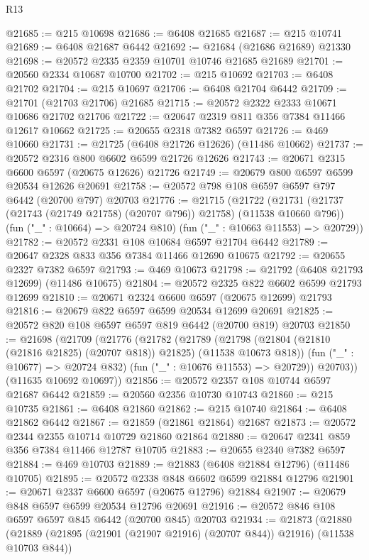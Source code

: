 \begin{lexlean}{R13}
\begin{coremodule}
@21685 := @215 @10698
@21686 := @6408 @21685
@21687 := @215 @10741
@21689 := @6408 @21687 @6442
@21692 := @21684 (@21686 @21689) @21330
@21698 := @20572 @2335 @2359 @10701 @10746 @21685 @21689
@21701 := @20560 @2334 @10687 @10700
@21702 := @215 @10692
@21703 := @6408 @21702
@21704 := @215 @10697
@21706 := @6408 @21704 @6442
@21709 := @21701 (@21703 @21706) @21685
@21715 := @20572 @2322 @2333 @10671 @10686 @21702 @21706
@21722 := @20647 @2319 @811 @356 @7384 @11466 @12617 @10662
@21725 := @20655 @2318 @7382 @6597
@21726 := @469 @10660
@21731 := @21725 (@6408 @21726 @12626) (@11486 @10662)
@21737 := @20572 @2316 @800 @6602 @6599 @21726 @12626
@21743 := @20671 @2315 @6600 @6597 (@20675 @12626) @21726
@21749 := @20679 @800 @6597 @6599 @20534 @12626 @20691
@21758 := @20572 @798 @108 @6597 @6597 @797 @6442 (@20700 @797) @20703
@21776 := @21715
    (@21722
      (@21731 (@21737 (@21743 (@21749 @21758) (@20707 @796)) @21758) (@11538 @10660 @796))
      (fun ("_" : @10664) => @20724 @810)
      (fun ("_" : @10663 @11553) => @20729))
@21782 := @20572 @2331 @108 @10684 @6597 @21704 @6442
@21789 := @20647 @2328 @833 @356 @7384 @11466 @12690 @10675
@21792 := @20655 @2327 @7382 @6597
@21793 := @469 @10673
@21798 := @21792 (@6408 @21793 @12699) (@11486 @10675)
@21804 := @20572 @2325 @822 @6602 @6599 @21793 @12699
@21810 := @20671 @2324 @6600 @6597 (@20675 @12699) @21793
@21816 := @20679 @822 @6597 @6599 @20534 @12699 @20691
@21825 := @20572 @820 @108 @6597 @6597 @819 @6442 (@20700 @819) @20703
@21850 := @21698
    (@21709
      (@21776
        (@21782
          (@21789
            (@21798 (@21804 (@21810 (@21816 @21825) (@20707 @818)) @21825) (@11538 @10673 @818))
            (fun ("_" : @10677) => @20724 @832)
            (fun ("_" : @10676 @11553) => @20729))
          @20703))
      (@11635 @10692 @10697))
@21856 := @20572 @2357 @108 @10744 @6597 @21687 @6442
@21859 := @20560 @2356 @10730 @10743
@21860 := @215 @10735
@21861 := @6408 @21860
@21862 := @215 @10740
@21864 := @6408 @21862 @6442
@21867 := @21859 (@21861 @21864) @21687
@21873 := @20572 @2344 @2355 @10714 @10729 @21860 @21864
@21880 := @20647 @2341 @859 @356 @7384 @11466 @12787 @10705
@21883 := @20655 @2340 @7382 @6597
@21884 := @469 @10703
@21889 := @21883 (@6408 @21884 @12796) (@11486 @10705)
@21895 := @20572 @2338 @848 @6602 @6599 @21884 @12796
@21901 := @20671 @2337 @6600 @6597 (@20675 @12796) @21884
@21907 := @20679 @848 @6597 @6599 @20534 @12796 @20691
@21916 := @20572 @846 @108 @6597 @6597 @845 @6442 (@20700 @845) @20703
@21934 := @21873
    (@21880
      (@21889 (@21895 (@21901 (@21907 @21916) (@20707 @844)) @21916) (@11538 @10703 @844))

\end{coremodule}
\end{lexlean}
